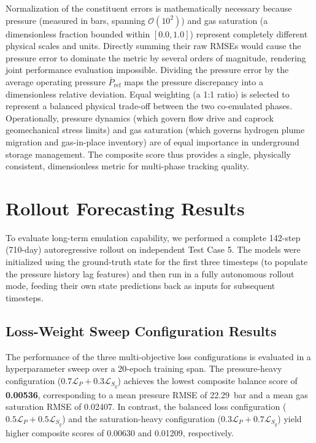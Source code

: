 \documentclass[10pt,twocolumn]{article}
\begin{document}
Normalization of the constituent errors is mathematically necessary because pressure (measured in bars, spanning $\mathcal{O}(10^2)$) and gas saturation (a dimensionless fraction bounded within $[0.0, 1.0]$) represent completely different physical scales and units. Directly summing their raw RMSEs would cause the pressure error to dominate the metric by several orders of magnitude, rendering joint performance evaluation impossible. Dividing the pressure error by the average operating pressure $\bar{P}_{\text{ref}}$ maps the pressure discrepancy into a dimensionless relative deviation. Equal weighting (a 1:1 ratio) is selected to represent a balanced physical trade-off between the two co-emulated phases. Operationally, pressure dynamics (which govern flow drive and caprock geomechanical stress limits) and gas saturation (which governs hydrogen plume migration and gas-in-place inventory) are of equal importance in underground storage management. The composite score thus provides a single, physically consistent, dimensionless metric for multi-phase tracking quality.

\section{Rollout Forecasting Results}
To evaluate long-term emulation capability, we performed a complete 142-step (710-day) autoregressive rollout on independent Test Case 5. The models were initialized using the ground-truth state for the first three timesteps (to populate the pressure history lag features) and then run in a fully autonomous rollout mode, feeding their own state predictions back as inputs for subsequent timesteps.

\subsection{Loss-Weight Sweep Configuration Results}
The performance of the three multi-objective loss configurations is evaluated in a hyperparameter sweep over a 20-epoch training span. The pressure-heavy configuration ($0.7\mathcal{L}_P + 0.3\mathcal{L}_{S_g}$) achieves the lowest composite balance score of \textbf{0.00536}, corresponding to a mean pressure RMSE of 22.29~bar and a mean gas saturation RMSE of 0.02407. In contrast, the balanced loss configuration ($0.5\mathcal{L}_P + 0.5\mathcal{L}_{S_g}$) and the saturation-heavy configuration ($0.3\mathcal{L}_P + 0.7\mathcal{L}_{S_g}$) yield higher composite scores of 0.00630 and 0.01209, respectively. 
\end{document}
